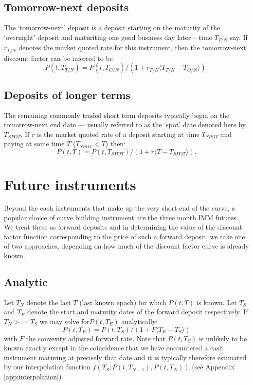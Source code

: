 \documentclass[a4paper]{article}
\begin{document}
\subsection{Tomorrow-next deposits}

The `tomorrow-next' deposit is a deposit starting on the maturity of the `overnight' deposit and maturiting one good business day later -- time $T_{T/N}$ say. If $r_{T/N}$ denotes the market quoted rate for this instrument, then the tomorrow-next discount factor can be inferred to be
\begin{equation}
  P(t, T_{T/N}) = P(t, T_{O/N}) / \left(1 + r_{T/N} \langle T_{T/N} - T_{O/N}\rangle \right).
\end{equation}

\subsection{Deposits of longer terms} \label{sec:deposits-of-longer-terms}

The remaining commonly traded short term deposits typically begin on the tomorrow-next end date --- usually referred to as the `spot' date denoted here by $T_{SPOT}$. If $r$ is the market quoted rate of a deposit starting at time $T_{SPOT}$ and paying at some time $T$ ($T_{SPOT} < T$) then:
\begin{equation}
  P(t, T) = P(t, T_{SPOT}) / \left(1 + r\langle T - T_{SPOT}\rangle \right).
\end{equation}

\section{Future instruments}

Beyond the cash instruments that make up the very short end of the curve, a popular choice of curve building instrument are the three month IMM futures. We treat these as forward deposits and in determining the value of the discount factor function corresponding to the price of such a forward deposit, we take one of two approaches, depending on how much of the discount factor curve is already known.

\subsection{Analytic}
Let $T_{N}$ denote the last $T$ (last known epoch) for which $P(t, T)$ is known. Let $T_{S}$ and $T_{E}$ denote the start and maturity dates of the forward deposit respectively. If $T_{N} >= T_{S}$ we may solve for$P(t, T_{E})$ analytically:
  \begin{equation}
    P(t, T_{E}) = P(t, T_{S}) / \left(1 + F\langle T_{E} - T_{S}\rangle \right) \label{eq:analytic-future}
  \end{equation} with $F$ the convexity adjusted forward rate. Note that $P(t, T_{S})$ is unlikely to be known exactly except in the coincidence that we have encountered a cash instrument maturing at precisely that date and it is typically therefore estimated by our interpolation function $f(T_{S}; P(t, T_{N - 1}), P(t, T_{N}))$ (see Appendix \ref{app:interpolation}).
\end{document}
